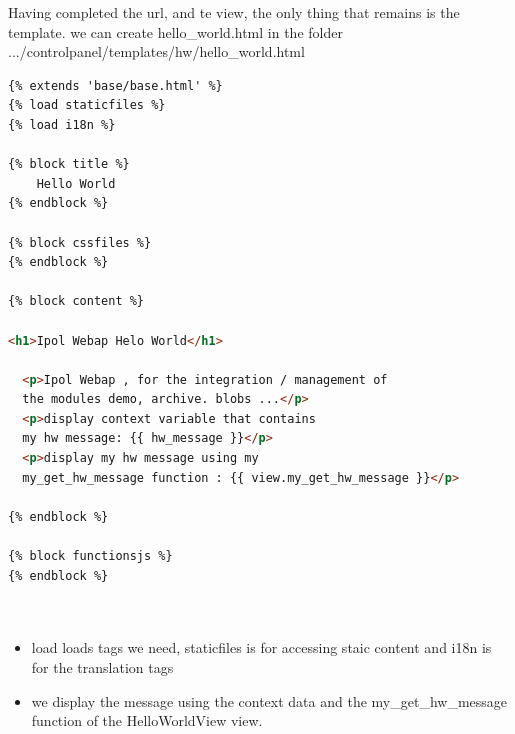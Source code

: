 Having completed the url, and te view, the only thing that remains is the template.
we can create hello\_world.html in the folder .../controlpanel/templates/hw/hello\_world.html

\begin{lstlisting}[language=html,firstnumber=1]
{% extends 'base/base.html' %}
{% load staticfiles %}
{% load i18n %}

{% block title %}
    Hello World
{% endblock %}

{% block cssfiles %}
{% endblock %}

{% block content %}

<h1>Ipol Webap Helo World</h1>

  <p>Ipol Webap , for the integration / management of 
  the modules demo, archive. blobs ...</p>
  <p>display context variable that contains 
  my hw message: {{ hw_message }}</p>
  <p>display my hw message using my 
  my_get_hw_message function : {{ view.my_get_hw_message }}</p>

{% endblock %}

{% block functionsjs %}
{% endblock %}

		
\end{lstlisting}

\begin{itemize}
\item  load loads tags we need, staticfiles is for accessing staic content and i18n is for the translation tags
\item  we display the message using the context data and the my\_get\_hw\_message function of the HelloWorldView view.

\end{itemize}

